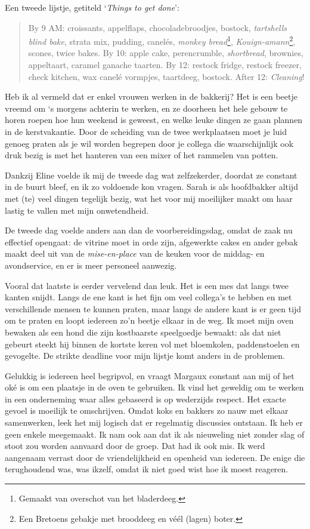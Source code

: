 \documentclass[
  11pt,
  dutch,
]{memoir}
\begin{document}
Een tweede lijstje, getiteld `\emph{Things to get done}':

\begin{quote}
By 9 AM: croissants, appelflaps, chocoladebroodjes, bostock,
\emph{tartshells blind bake}, strata mix, pudding, canelés, \emph{monkey
bread}\footnote{Gemaakt van overschot van het bladerdeeg.},
\emph{Kouign-amann}\footnote{Een Bretoens gebakje met brooddeeg en véél
  (lagen) boter.}, scones, twice bakes. By 10: apple cake, perencrumble,
\emph{shortbread}, brownies, appeltaart, caramel ganache taarten. By 12:
restock fridge, restock freezer, check kitchen, wax canelé vormpjes,
taartdeeg, bostock. After 12: \emph{Cleaning}!
\end{quote}

Heb ik al vermeld dat er enkel vrouwen werken in de bakkerij? Het is een
beetje vreemd om `s morgens achterin te werken, en ze doorheen het hele
gebouw te horen roepen hoe hun weekend is geweest, en welke leuke dingen
ze gaan plannen in de kerstvakantie. Door de scheiding van de twee
werkplaatsen moet je luid genoeg praten als je wil worden begrepen door
je collega die waarschijnlijk ook druk bezig is met het hanteren van een
mixer of het rammelen van potten.

Dankzij Eline voelde ik mij de tweede dag wat zelfzekerder, doordat ze
constant in de buurt bleef, en ik zo voldoende kon vragen. Sarah is als
hoofdbakker altijd met (te) veel dingen tegelijk bezig, wat het voor mij
moeilijker maakt om haar lastig te vallen met mijn onwetendheid.

De tweede dag voelde anders aan dan de voorbereidingsdag, omdat de zaak
nu effectief opengaat: de vitrine moet in orde zijn, afgewerkte cakes en
ander gebak maakt deel uit van de \emph{mise-en-place} van de keuken
voor de middag- en avondservice, en er is meer personeel aanwezig.

Vooral dat laatste is eerder vervelend dan leuk. Het is een mes dat
langs twee kanten snijdt. Langs de ene kant is het fijn om veel
collega's te hebben en met verschillende mensen te kunnen praten, maar
langs de andere kant is er geen tijd om te praten en loopt iedereen zo'n
beetje elkaar in de weg. Ik moet mijn oven bewaken als een hond die zijn
kostbaarste speelgoedje bewaakt: als dat niet gebeurt steekt hij binnen
de kortste keren vol met bloemkolen, paddenstoelen en gevogelte. De
strikte deadline voor mijn lijstje komt anders in de problemen.

Gelukkig is iedereen heel begripvol, en vraagt Margaux constant aan mij
of het oké is om een plaatsje in de oven te gebruiken. Ik vind het
geweldig om te werken in een onderneming waar alles gebaseerd is op
wederzijds respect. Het exacte gevoel is moeilijk te omschrijven. Omdat
koks en bakkers zo nauw met elkaar samenwerken, leek het mij logisch dat
er regelmatig discussies ontstaan. Ik heb er geen enkele meegemaakt. Ik
nam ook aan dat ik als nieuweling niet zonder slag of stoot zou worden
aanvaard door de groep. Dat had ik ook mis. Ik werd aangenaam verrast
door de vriendelijkheid en openheid van iedereen. De enige die
terughoudend was, was ikzelf, omdat ik niet goed wist hoe ik moest
reageren.
\end{document}
